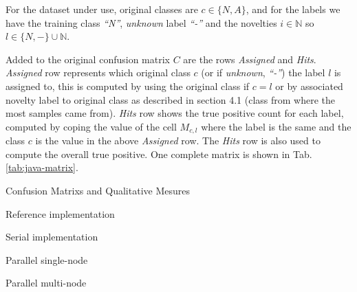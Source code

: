 For the dataset under use, original classes are $c \in \{N, A\}$, and for the
labels we have the training class
\emph{``N''}, \emph{unknown} label \emph{``-''} and the novelties $i \in
\mathbb{N}$ so $l \in \{N, -\} \cup \mathbb{N}$.

Added to the original confusion matrix $C$ are the rows \emph{Assigned} and
\emph{Hits}.
\emph{Assigned} row represents which original class $c$ (or if \emph{unknown},
\emph{``-''}) the label $l$ is assigned to, this is computed by using the
original class if $c = l$ or by associated novelty label to original class as
described in \cite{DeFaria2015evaluation} section 4.1
(class from where the most samples came from).
\emph{Hits} row shows the true positive count for each label,
computed by coping the value of the cell $M_{c, l}$ where the label is the same
and the class $c$ is the value in the above \emph{Assigned} row.
The \emph{Hits} row is also used to compute the overall true positive.
One complete matrix is shown in Tab. \ref{tab:java-matrix}.

%   

\begin{table}[htb]
\caption{Confusion Matrixs and Qualitative Mesures}
\label{tab:confusion-matrixes-ref-serial}
\begin{subtable}[h]{\textwidth}\begin{center}
    \caption{Reference implementation}
    
    \label{tab:java-matrix}
\end{center}\end{subtable}
\begin{subtable}[h]{\textwidth}\begin{center}
    \whencolumns{}{\vspace{5mm}}
    \caption{Serial implementation}
    
    \label{tab:libc-matrix}
    \whencolumns{}{\vspace{5mm}}
\end{center}\end{subtable}
\begin{subtable}[h]{0.5\textwidth}\begin{center}
  \caption{Parallel single-node}
  
  \label{tab:single-node-matrix}
\end{center}\end{subtable}
\begin{subtable}[h]{0.5\textwidth}\begin{center}
  \caption{Parallel multi-node}
  
  \label{tab:multi-node-matrix}
\end{center}\end{subtable}
\end{table}

